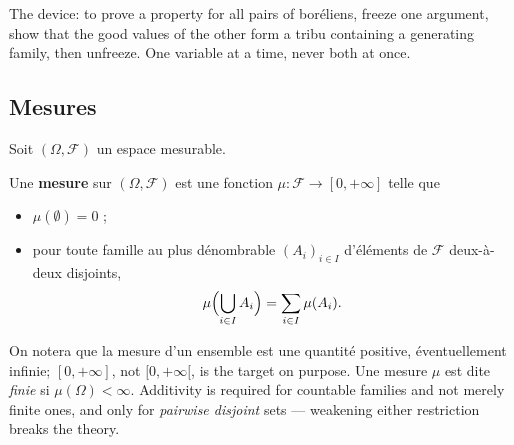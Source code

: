The device: to prove a property for all pairs of boréliens, freeze one argument,
show that the good values of the other form a tribu containing a generating family,
then unfreeze. One variable at a time, never both at once.

\subsection{Mesures}

Soit $(\Omega,\mathcal{F})$ un espace mesurable.

\begin{definition}[Mesure]
  Une \textbf{mesure} sur $(\Omega,\mathcal{F})$ est une fonction $\mu :
  \mathcal{F} \to [0,+\infty]$ telle que
  \begin{itemize}
    \item $\mu(\emptyset) = 0$ ;
    \item pour toute famille au plus dénombrable $(A_{i})_{i \in I}$ d'éléments de
      $\mathcal{F}$ deux-à-deux disjoints,
      \[
        \mu\Bigl(\bigcup_{i \in I} A_{i}\Bigr) = \sum_{i \in I} \mu(A_{i}).
      \]
  \end{itemize}
\end{definition}

\begin{figure}[h!]
  \centering
\end{figure}

\medskip
On notera que la mesure d'un ensemble est une quantité positive, éventuellement
infinie; $[0,+\infty]$, not $[0,+\infty[$, is the target on purpose. Une mesure
$\mu$ est dite \emph{finie} si $\mu(\Omega) < \infty$. Additivity is required for
countable families and not merely finite ones, and only for \emph{pairwise disjoint}
sets --- weakening either restriction breaks the theory.

